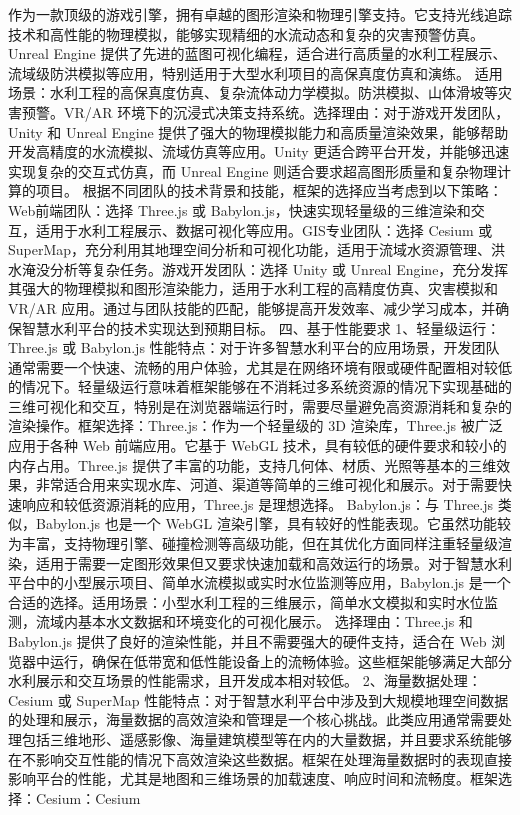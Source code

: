 {作为一款顶级的游戏引擎，拥有卓越的图形渲染和物理引擎支持。它支持光线追踪技术和高性能的物理模拟，能够实现精细的水流动态和复杂的灾害预警仿真。Unreal Engine
提供了先进的蓝图可视化编程，适合进行高质量的水利工程展示、流域级防洪模拟等应用，特别适用于大型水利项目的高保真度仿真和演练。 适用场景：水利工程的高保真度仿真、复杂流体动力学模拟。防洪模拟、山体滑坡等灾害预警。VR/AR
环境下的沉浸式决策支持系统。选择理由：对于游戏开发团队，Unity 和 Unreal Engine 提供了强大的物理模拟能力和高质量渲染效果，能够帮助开发高精度的水流模拟、流域仿真等应用。Unity
更适合跨平台开发，并能够迅速实现复杂的交互式仿真，而 Unreal Engine 则适合要求超高图形质量和复杂物理计算的项目。 根据不同团队的技术背景和技能，框架的选择应当考虑到以下策略：Web前端团队：选择 Three.js 或
Babylon.js，快速实现轻量级的三维渲染和交互，适用于水利工程展示、数据可视化等应用。GIS专业团队：选择 Cesium 或
SuperMap，充分利用其地理空间分析和可视化功能，适用于流域水资源管理、洪水淹没分析等复杂任务。游戏开发团队：选择 Unity 或 Unreal
Engine，充分发挥其强大的物理模拟和图形渲染能力，适用于水利工程的高精度仿真、灾害模拟和 VR/AR 应用。通过与团队技能的匹配，能够提高开发效率、减少学习成本，并确保智慧水利平台的技术实现达到预期目标。 四、基于性能要求
1、轻量级运行：Three.js 或 Babylon.js
性能特点：对于许多智慧水利平台的应用场景，开发团队通常需要一个快速、流畅的用户体验，尤其是在网络环境有限或硬件配置相对较低的情况下。轻量级运行意味着框架能够在不消耗过多系统资源的情况下实现基础的三维可视化和交互，特别是在浏览器端运行时，需要尽量避免高资源消耗和复杂的渲染操作。框架选择：Three.js：作为一个轻量级的
3D 渲染库，Three.js 被广泛应用于各种 Web 前端应用。它基于 WebGL 技术，具有较低的硬件要求和较小的内存占用。Three.js
提供了丰富的功能，支持几何体、材质、光照等基本的三维效果，非常适合用来实现水库、河道、渠道等简单的三维可视化和展示。对于需要快速响应和较低资源消耗的应用，Three.js 是理想选择。 Babylon.js：与 Three.js
类似，Babylon.js 也是一个 WebGL
渲染引擎，具有较好的性能表现。它虽然功能较为丰富，支持物理引擎、碰撞检测等高级功能，但在其优化方面同样注重轻量级渲染，适用于需要一定图形效果但又要求快速加载和高效运行的场景。对于智慧水利平台中的小型展示项目、简单水流模拟或实时水位监测等应用，Babylon.js
是一个合适的选择。适用场景：小型水利工程的三维展示，简单水文模拟和实时水位监测，流域内基本水文数据和环境变化的可视化展示。 选择理由：Three.js 和 Babylon.js 提供了良好的渲染性能，并且不需要强大的硬件支持，适合在 Web
浏览器中运行，确保在低带宽和低性能设备上的流畅体验。这些框架能够满足大部分水利展示和交互场景的性能需求，且开发成本相对较低。 2、海量数据处理：Cesium 或 SuperMap
性能特点：对于智慧水利平台中涉及到大规模地理空间数据的处理和展示，海量数据的高效渲染和管理是一个核心挑战。此类应用通常需要处理包括三维地形、遥感影像、海量建筑模型等在内的大量数据，并且要求系统能够在不影响交互性能的情况下高效渲染这些数据。框架在处理海量数据时的表现直接影响平台的性能，尤其是地图和三维场景的加载速度、响应时间和流畅度。框架选择：Cesium：Cesium
}

